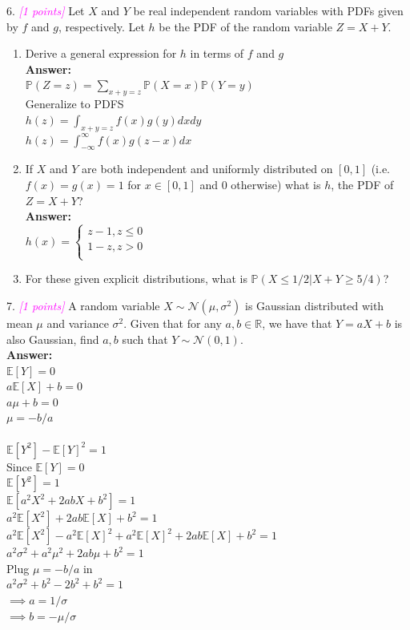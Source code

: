 \documentclass{article}
\newcommand{\field}[1]{\mathbb{#1}}
\newcommand{\1}{\mathbf{1}}
\renewcommand{\P}{\mathbb{P}}
\newcommand{\R}{\field{R}} %
\newcommand{\ProbOpr}[1]{\mathbb{#1}}
\newcommand{\grade}[1]{\small\textcolor{magenta}{\emph{[#1 points]}} \normalsize}
\begin{document}
6. \grade{1} Let $X$ and $Y$ be real independent random variables with PDFs given by $f$ and $g$, respectively. Let $h$ be the PDF of the random variable $Z = X+Y$.
\begin{enumerate}
	\item Derive a general expression for $h$ in terms of $f$ and $g$\\
	\textbf{Answer:}\\
	$\P(Z=z)=\sum_{x+y=z} \P(X=x)\P(Y=y)$\\
	Generalize to PDFS\\
	$h(z)=\int_{x+y=z} f(x)g(y)dxdy$\\
	$h(z)=\int_{-\infty}^{\infty} f(x)g(z-x)dx$\\
	
	\item If $X$ and $Y$ are both independent and uniformly distributed on $[0,1]$ (i.e. $f(x)=g(x)=1$ for $x \in [0,1]$ and $0$ otherwise) what is $h$, the PDF of $Z=X+Y$?\\
	\textbf{Answer:}\\
	$h(x)=  \begin{cases}
			z-1, z\leq 0\\
			1-z, z>0\\
			\end{cases}$
	
	\item For these given explicit distributions, what is $\P(X \leq 1/2 | X+Y\geq 5/4)$?
\end{enumerate}

7. \grade{1} A random variable $X \sim \mathcal{N}(\mu, \sigma^2)$ is Gaussian distributed with mean $\mu$ and variance $\sigma^2$. Given that for any $a,b \in \R$, we have that $Y = aX + b$ is also Gaussian, find $a,b$ such that $Y \sim \mathcal{N}(0,1)$.\\
\textbf{Answer:}\\
$\ProbOpr{E}[Y]=0$\\
$a \ProbOpr{E}[X]+b=0$\\
$a\mu+b=0$\\
$\mu=-b/a$\\
\\
$\ProbOpr{E}[Y^2]-\ProbOpr{E}[Y]^2=1$\\
Since $\ProbOpr{E}[Y]=0$\\
$\ProbOpr{E}[Y^2]=1$\\
$\ProbOpr{E}[a^2 X^2+2abX+b^2]=1$\\
$a^2 \ProbOpr{E}[X^2]+2ab\ProbOpr{E}[X]+b^2=1$\\
$a^2 \ProbOpr{E}[X^2]-a^2\ProbOpr{E}[X]^2+a^2\ProbOpr{E}[X]^2+2ab\ProbOpr{E}[X]+b^2=1$\\
$a^2 \sigma^2+a^2\mu^2+2ab\mu+b^2=1$\\
Plug $\mu=-b/a$ in\\
$a^2 \sigma^2+b^2-2b^2+b^2=1$\\
$\implies a=1/\sigma$\\
$\implies b=-\mu/\sigma$\\
\end{document}
